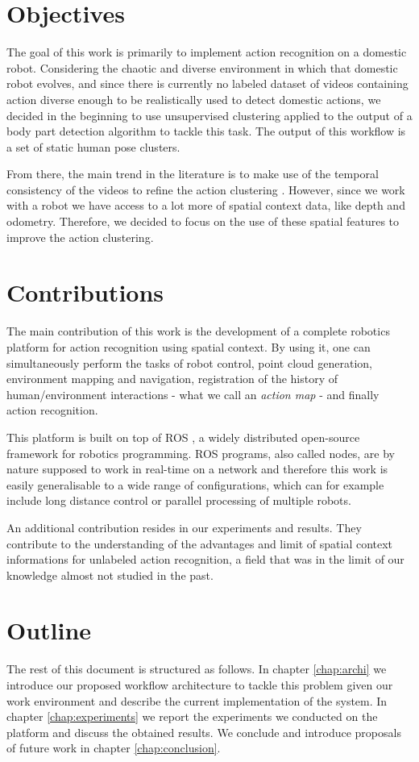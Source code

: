\section{Objectives}
The goal of this work is primarily to implement action recognition on a domestic robot. Considering the chaotic and diverse environment in which that domestic robot evolves, and since there is currently no labeled dataset of videos containing action diverse enough to be realistically used to detect domestic actions, we decided in the beginning to use unsupervised clustering applied to the output of a body part detection algorithm to tackle this task. The output of this workflow is a set of static human pose clusters. 

From there, the main trend in the literature is to make use of the temporal consistency of the videos to refine the action clustering \cite{unsup_time_seq_action_recognition, action_matching}. However, since we work with a robot we have access to a lot more of spatial context data, like depth and odometry. Therefore, we decided to focus on the use of these spatial features to improve the action clustering.

\section{Contributions}
The main contribution of this work is the development of a complete robotics platform for action recognition using spatial context. By using it, one can simultaneously perform the tasks of robot control, point cloud generation, environment mapping and navigation, registration of the history of human/environment interactions - what we call an \emph{action map} - and finally action recognition.

This platform is built on top of ROS \cite{ROS}, a widely distributed open-source framework for robotics programming. ROS programs, also called nodes, are by nature supposed to work in real-time on a network and therefore this work is easily generalisable to a wide range of configurations, which can for example include long distance control or parallel processing of multiple robots.

An additional contribution resides in our experiments and results. They contribute to the understanding of the advantages and limit of spatial context informations for unlabeled action recognition, a field that was in the limit of our knowledge almost not studied in the past. 

\section{Outline}
The rest of this document is structured as follows. In chapter \ref{chap:archi} we introduce our proposed workflow architecture to tackle this problem given our work environment and describe the current implementation of the system. In chapter \ref{chap:experiments} we report the experiments we conducted on the platform and discuss the obtained results. We conclude and introduce proposals of future work in chapter \ref{chap:conclusion}. 